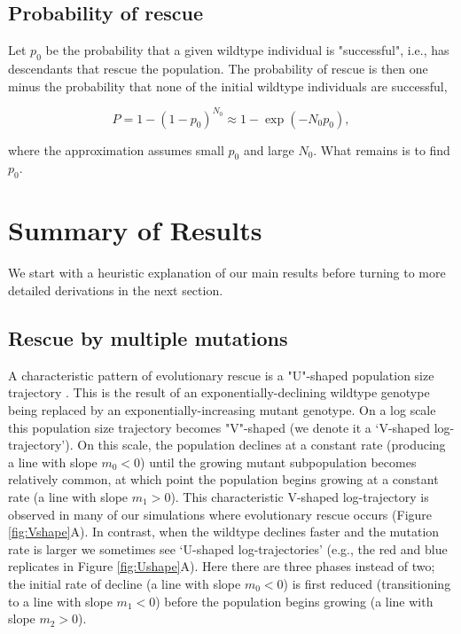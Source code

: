 \documentclass[9pt,twocolumn,twoside,lineno]{gsajnl}
\begin{document}
\subsection{Probability of rescue}

Let $p_0$ be the probability that a given wildtype individual is "successful", i.e., has descendants that rescue the population. 
The probability of rescue is then one minus the probability that none of the initial wildtype individuals are successful,

\begin{equation}\label{eq:Prescue}
P = 1-(1-p_0)^{N_0} \approx 1 - \exp \left(- N_0 p_0 \right),
\end{equation} 

\noindent where the approximation assumes small $p_0$ and large $N_0$. 
What remains is to find $p_0$.

\section{Summary of Results}
\label{sec:summary}

We start with a heuristic explanation of our main results before turning to more detailed derivations in the next section.

\subsection{Rescue by multiple mutations}

A characteristic pattern of evolutionary rescue is a "U"-shaped population size trajectory \citep[e.g.,][]{Orr2014}.
This is the result of an exponentially-declining wildtype genotype being replaced by an exponentially-increasing mutant genotype.
On a log scale this population size trajectory becomes "V"-shaped (we denote it a `V-shaped log-trajectory').
On this scale, the population declines at a constant rate (producing a line with slope $m_0<0$) until the growing mutant subpopulation becomes relatively common, at which point the population begins growing at a constant rate (a line with slope $m_1>0$).
This characteristic V-shaped log-trajectory is observed in many of our simulations where evolutionary rescue occurs (Figure \ref{fig:Vshape}A).
In contrast, when the wildtype declines faster and the mutation rate is larger we sometimes see `U-shaped log-trajectories' (e.g., the red and blue replicates in Figure \ref{fig:Ushape}A).
Here there are three phases instead of two; the initial rate of decline (a line with slope $m_0<0$) is first reduced (transitioning to a line with slope $m_1<0$) before the population begins growing (a line with slope $m_2>0$).  
\end{document}
